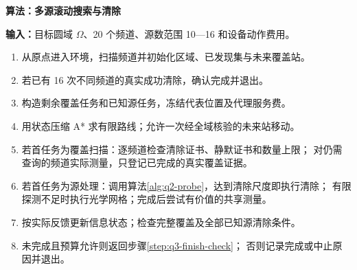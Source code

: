 \par\noindent\begin{minipage}{\linewidth}
\label{alg:q3-search}
\textbf{算法\thealgorithm：多源滚动搜索与清除}

\small
\textbf{输入：}目标圆域 \(\Omega\)、20 个频道、源数范围 10---16 和设备动作费用。
\begin{enumerate}[label=\arabic*.,ref=\arabic*,leftmargin=2em,itemsep=2pt,topsep=4pt]
  \item 从原点进入环境，扫描频道并初始化区域、已发现集与未来覆盖站。
  \item\label{step:q3-finish-check} 若已有 16 次不同频道的真实成功清除，确认完成并退出。
  \item 构造剩余覆盖任务和已知源任务，冻结代表位置及代理服务费。
  \item 用状态压缩 A* 求有限路线；允许一次经全域核验的未来站移动。
  \item 若首任务为覆盖扫描：逐频道检查清除证书、静默证书和数量上限；
        对仍需查询的频道实际测量，只登记已完成的真实覆盖证据。
  \item 若首任务为源处理：调用算法\ref{alg:q2-probe}，达到清除尺度即执行清除；
        有限探测不足时执行光学网格；完成后尝试有价值的共享测量。
  \item 按实际反馈更新信息状态；检查完整覆盖及全部已知源清除条件。
  \item 未完成且预算允许则返回步骤\ref{step:q3-finish-check}；
        否则记录完成或中止原因并退出。
\end{enumerate}
\end{minipage}\par


